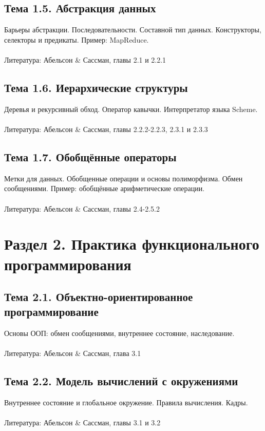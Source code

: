 \documentclass[a4paper,11pt]{article}
\begin{document}
\subsection*{Тема 1.5. Абстракция данных}
Барьеры абстракции. Последовательности. Составной тип данных. Конструкторы,
селекторы и предикаты. Пример: MapReduce.
\\\\
Литература: Абельсон \& Сассман, главы 2.1 и 2.2.1

\subsection*{Тема 1.6. Иерархические структуры}
Деревья и рекурсивный обход. Оператор кавычки. Интерпретатор языка Scheme.
\\\\
Литература: Абельсон \& Сассман, главы 2.2.2-2.2.3, 2.3.1 и 2.3.3

\subsection*{Тема 1.7. Обобщённые операторы}
Метки для данных. Обобщенные операции и основы полиморфизма. Обмен сообщениями.
Пример: обобщённые арифметические операции.
\\\\
Литература: Абельсон \& Сассман, главы 2.4-2.5.2

\section*{Раздел 2. Практика функционального программирования}

\subsection*{Тема 2.1. Объектно-ориентированное программирование}
Основы ООП: обмен сообщениями, внутреннее состояние, наследование.
\\\\
Литература: Абельсон \& Сассман, глава 3.1

\subsection*{Тема 2.2. Модель вычислений с окружениями}
Внутреннее состояние и глобальное окружение. Правила вычисления. Кадры.
\\\\
Литература: Абельсон \& Сассман, главы 3.1 и 3.2
\end{document}
